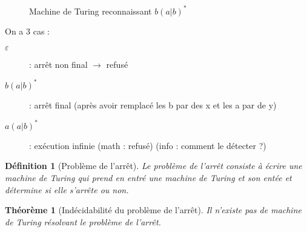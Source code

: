 \documentclass{article}
\theoremstyle{plain}
\theoremstyle{nonumberplain}
\newtheorem{thm}{Théorème}
\newtheorem{defi}{Définition}
\begin{document}
  \begin{figure}[!htb]
    \caption{Machine de Turing reconnaissant $b(a|b)^*$}
  \end{figure}

  On a 3 cas :

  \begin{description}
    \item[$\varepsilon$] : arrêt non final $\rightarrow$ refusé
    \item[$b(a|b)^*$] : arrêt final (après avoir remplacé 
      les b par des x et les a par de y)
    \item[$a(a|b)^*$] : exécution infinie (math : refusé) (info : comment le détecter ?)
  \end{description}

  \begin{defi}[Problème de l'arrêt]
    Le problème de l'arrêt consiste à écrire une 
    machine de Turing qui prend en entré une machine de Turing 
    et son entée et détermine si elle s'arrête ou non.
  \end{defi}

  \begin{thm}[Indécidabilité du problème de l'arrêt]
    Il n'existe pas de machine de Turing résolvant le problème de l'arrêt.
  \end{thm}
\end{document}
